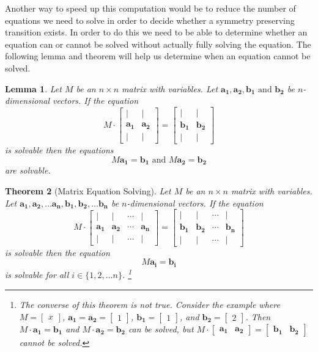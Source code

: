 \documentclass[a4paper,10pt]{article}
\let\oldfootnote\footnote
\renewcommand{\footnote}{\unskip\oldfootnote}
\theoremstyle{plain}
\newtheorem{Theorem}{Theorem}
\newtheorem{Lemma}[Theorem]{Lemma}
\theoremstyle{definition}
\theoremstyle{remark}
\renewcommand{\vec}[1]{\mathbf{#1}}
\begin{document}
Another way to speed up this computation would be to reduce the number of equations we need to solve in order to decide whether a symmetry preserving transition exists.
In order to do this we need to be able to determine whether an equation can or cannot be solved without actually fully solving the equation.
The following lemma and theorem will help us determine when an equation cannot be solved.
\begin{Lemma}
	Let \( M \) be an \( n \times n \) matrix with variables.
	Let \( \vec{a_1}, \vec{a_2}, \vec{b_1} \text{ and } \vec{b_2} \) be \( n \)-dimensional vectors.
	If the equation \[
	M
	\cdot
	\begin{bmatrix}
		| & | \\
		\vec{a_1} & \vec{a_2} \\
		| & |
	\end{bmatrix}
	=
	\begin{bmatrix}
		| & | \\
		\vec{b_1} & \vec{b_2} \\
		| & |
	\end{bmatrix}
	\]
	is solvable then the equations \[M\vec{a_1} = \vec{b_1} \text{ and } M\vec{a_2} = \vec{b_2}\] are solvable.
\end{Lemma}
\begin{Theorem}[Matrix Equation Solving]
	Let \( M \) be an \( n \times n \) matrix with variables.
	Let \( \vec{a_1}, \vec{a_2}, \dots \vec{a_n}, \vec{b_1}, \vec{b_2}, \dots \vec{b_n} \) be \( n \)-dimensional vectors.
	If the equation \[
	M
	\cdot
	\begin{bmatrix}
		| & | & \cdots & |\\
		\vec{a_1} & \vec{a_2} & \cdots & \vec{a_n} \\
		| & | & \cdots & |
	\end{bmatrix}
	=
	\begin{bmatrix}
		| & | & \cdots & |\\
		\vec{b_1} & \vec{b_2} & \cdots & \vec{b_n} \\
		| & | & \cdots & |
	\end{bmatrix}
	\]
	is solvable then the equation \[M\vec{a_i} = \vec{b_i}\] is solvable for all \( i \in \{1, 2, \dots n\} \).
	\footnote{
		The converse of this theorem is not true.
		Consider the example where \(M = \begin{bmatrix} x \end{bmatrix} \),
		\( \vec{a_1} = \vec{a_2} =  \begin{bmatrix} 1 \end{bmatrix}\),
		\( \vec{b_1} =  \begin{bmatrix} 1 \end{bmatrix}\), and
		\( \vec{b_2} = \begin{bmatrix} 2 \end{bmatrix} \).
		Then \( M\cdot\vec{a_1} = \vec{b_1} \) and \( M\cdot\vec{a_2} =  \vec{b_2}\) can be solved, but \( M\cdot\begin{bmatrix} \vec{a_1} & \vec{a_2} \end{bmatrix} = \begin{bmatrix} \vec{b_1} & \vec{b_2} \end{bmatrix}\) cannot be solved.
	}
	\label{thrm:matrix-equation-solving}
\end{Theorem}
\end{document}
